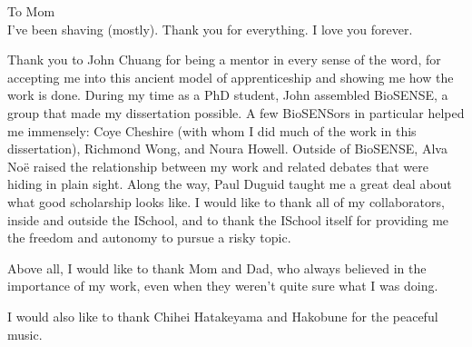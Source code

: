 \begin{frontmatter}

\begin{dedication}
\null\vfil
\begin{center}


To Mom\\\vspace{12pt} I've been shaving (mostly). Thank you for everything. I
love you forever.
\end{center}
\vfil\null
\end{dedication}


\tableofcontents
\clearpage
\listoffigures
\clearpage
\listoftables

\begin{acknowledgements}
Thank you to John Chuang for being a mentor in every sense of the word, for
accepting me into this ancient model of apprenticeship and showing me how the
work is done. During my time as a PhD student, John assembled BioSENSE, a group
that made my dissertation possible. A few BioSENSors in particular helped me
immensely: Coye Cheshire (with whom I did much of the work in this
dissertation), Richmond Wong, and Noura Howell. Outside of BioSENSE, Alva Noë
raised the relationship between my work and related debates that were hiding in
plain sight. Along the way, Paul Duguid taught me a great deal about what good
scholarship looks like. I would like to thank all of my collaborators, inside
and outside the ISchool, and to thank the ISchool itself for providing me the
freedom and autonomy to pursue a risky topic.

Above all, I would like to thank Mom and Dad, who always believed in the
importance of my work, even when they weren't quite sure what I was doing.

I would also like to thank Chihei Hatakeyama and Hakobune for the peaceful music.
\end{acknowledgements}


\end{frontmatter}
